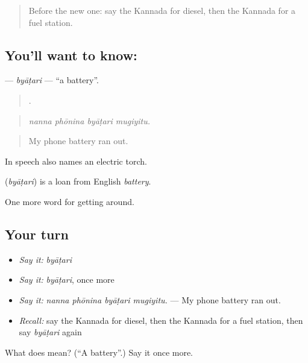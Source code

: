\label{lesson:KA-C448-byatari}



\begin{quote}
Before the new one: say the Kannada for diesel, then the Kannada for a fuel station.
\end{quote}

\subsection*{You'll want to know: }
\textbf{} — \emph{byāṭari} — \textquotedblleft{}a battery\textquotedblright{}.

\begin{quote}
   .
\end{quote}

\begin{quote}
\emph{nanna phōnina byāṭari mugiyitu.}
\end{quote}

\begin{quote}
My phone battery ran out.
\end{quote}

In speech  also names an electric torch.

\begin{cousinweb}
\textbf{} (\emph{byāṭari}) is a loan from English \emph{battery}.
\end{cousinweb}

\begin{grammarlens}[title={What you've built}]
One more word for getting around.
\end{grammarlens}

\subsection*{Your turn}
\begin{itemize}
\raggedright
  \item \emph{Say it:} \emph{byāṭari}
  \item \emph{Say it:} \emph{byāṭari}, once more
  \item \emph{Say it:} \emph{nanna phōnina byāṭari mugiyitu.} — My phone battery ran out.
  \item \emph{Recall:} say the Kannada for diesel, then the Kannada for a fuel station, then say \emph{byāṭari} again
\end{itemize}

\begin{tcolorbox}[breakable,colback=teal!4,colframe=teal!35!black,title={Before you move on}]
What does  mean? (\textquotedblleft{}A battery\textquotedblright{}.) Say it once more.
\end{tcolorbox}
